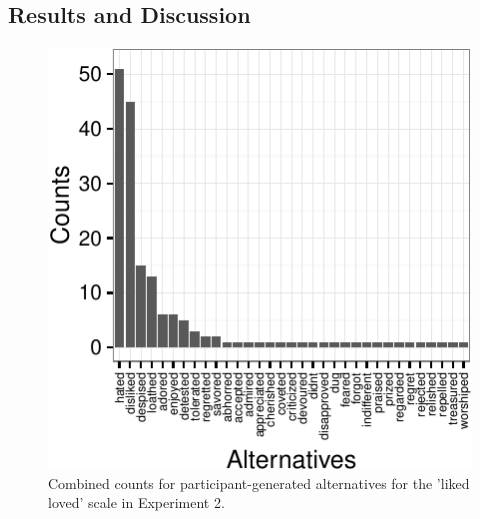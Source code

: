 \documentclass[10pt, letterpaper]{article}
\newenvironment{CodeChunk}{}{}
\begin{document}
\subsection{Results and Discussion}\label{results-and-discussion-1}

\begin{CodeChunk}
\begin{figure}[t]

{\centering \includegraphics{figs/exp2_altsPlot_likedLoved-1} 

}

\caption[Combined counts for participant-generated alternatives for the 'liked  loved' scale in Experiment 2]{Combined counts for participant-generated alternatives for the 'liked  loved' scale in Experiment 2.}\label{fig:exp2_altsPlot_likedLoved}
\end{figure}
\end{CodeChunk}
\end{document}
